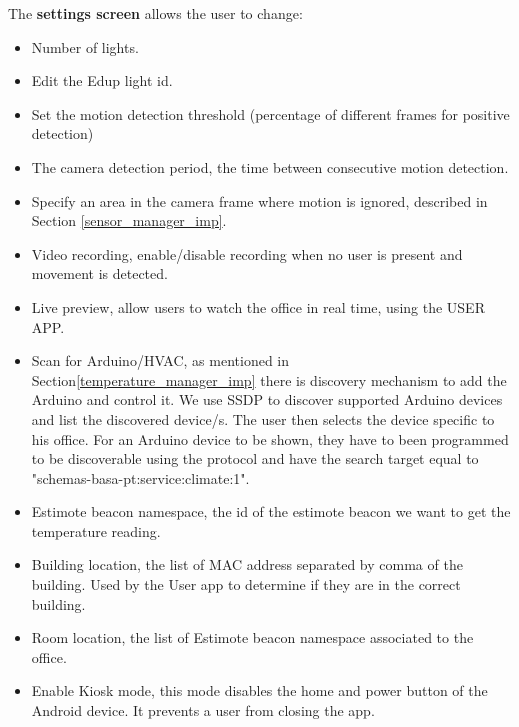 The \textbf{settings screen} allows the user to change:
\begin{itemize}
  \item Number of lights.
  \item Edit the Edup light id.
  
  \item Set the motion detection threshold (percentage of different frames for positive detection)
  
  \item The camera detection period, the time between consecutive motion detection.
  
  \item Specify an area in the camera frame where motion is ignored, described in Section \ref{sensor_manager_imp}. 
  
  \item Video recording, enable/disable recording when no user is present and movement is detected.
  
  \item Live preview, allow users to watch the office in real time, using the USER APP.
  
  \item Scan for Arduino/HVAC, as mentioned in Section\ref{temperature_manager_imp} there is discovery mechanism to add the Arduino and control it. We use \ac{SSDP} to discover supported Arduino devices and list the discovered device/s. The user then selects the device specific to his office.
  For an Arduino device to be shown, they have to been programmed to be discoverable using the protocol and have the search target equal to "schemas-basa-pt:service:climate:1".
  
  \item Estimote beacon namespace, the id of the estimote beacon we want to get the temperature reading.
  
  \item Building location, the list of \ac{MAC address} separated by comma of the building. Used by the User app to determine if they are in the correct building.
  
  \item Room location, the list of Estimote beacon namespace associated to the office.
  
  
  \item Enable Kiosk mode, this mode disables the home and power button of the Android device. It prevents a user from closing the app. 
    
  
\end{itemize}




